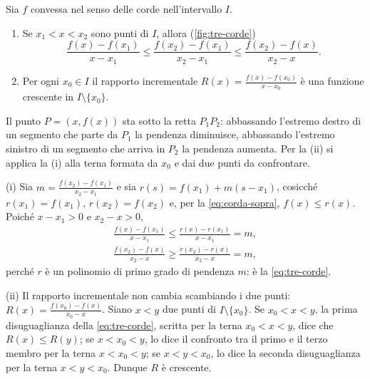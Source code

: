\begin{lemma}\label{lem:tre-corde}
Sia $f$ convessa nel senso delle corde nell'intervallo $I$.
\begin{enumerate}[label=\textup{(\roman*)}]
  \item Se $x_{1}<x<x_{2}$ sono punti di $I$, allora (\cref{fig:tre-corde})
  \begin{equation}\label{eq:tre-corde}
    \frac{f(x)-f(x_{1})}{x-x_{1}}\le\frac{f(x_{2})-f(x_{1})}{x_{2}-x_{1}}
    \le\frac{f(x_{2})-f(x)}{x_{2}-x} .
  \end{equation}
  \item Per ogni $x_{0}\in I$ il rapporto incrementale
  $R(x)=\frac{f(x)-f(x_{0})}{x-x_{0}}$ è una funzione crescente in $I\setminus\{x_{0}\}$.
\end{enumerate}
\end{lemma}

\begin{schema}
\end{schema}

\begin{strategia}
Il punto $P=(x,f(x))$ sta sotto la retta $P_{1}P_{2}$: abbassando l'estremo destro di un
segmento che parte da $P_{1}$ la pendenza diminuisce, abbassando l'estremo sinistro di un
segmento che arriva in $P_{2}$ la pendenza aumenta. Per la (ii) si applica la (i) alla
terna formata da $x_{0}$ e dai due punti da confrontare.
\end{strategia}

\begin{dimostrazione}
(i) Sia $m=\frac{f(x_{2})-f(x_{1})}{x_{2}-x_{1}}$ e sia $r(s)=f(x_{1})+m(s-x_{1})$, cosicché
$r(x_{1})=f(x_{1})$, $r(x_{2})=f(x_{2})$ e, per la \eqref{eq:corda-sopra}, $f(x)\le r(x)$.
Poiché $x-x_{1}>0$ e $x_{2}-x>0$,
\[
\begin{gathered}
  \frac{f(x)-f(x_{1})}{x-x_{1}}\le\frac{r(x)-r(x_{1})}{x-x_{1}}=m ,\\[2pt]
  \frac{f(x_{2})-f(x)}{x_{2}-x}\ge\frac{r(x_{2})-r(x)}{x_{2}-x}=m ,
\end{gathered}
\]
perché $r$ è un polinomio di primo grado di pendenza $m$: è la \eqref{eq:tre-corde}.

(ii) Il rapporto incrementale non cambia scambiando i due punti:
$R(x)=\frac{f(x_{0})-f(x)}{x_{0}-x}$. Siano $x<y$ due punti di $I\setminus\{x_{0}\}$. Se
$x_{0}<x<y$, la prima disuguaglianza della \eqref{eq:tre-corde}, scritta per la terna
$x_{0}<x<y$, dice che $R(x)\le R(y)$; se $x<x_{0}<y$, lo dice il confronto tra il primo e
il terzo membro per la terna $x<x_{0}<y$; se $x<y<x_{0}$, lo dice la seconda
disuguaglianza per la terna $x<y<x_{0}$. Dunque $R$ è crescente.
\end{dimostrazione}

